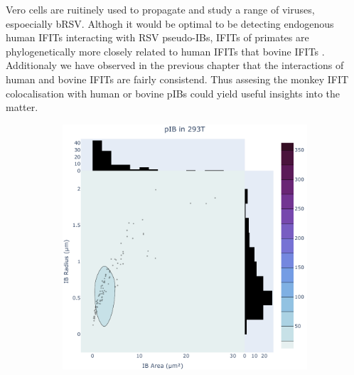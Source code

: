 Vero cells are ruitinely used to propagate and study a range of viruses, espoecially bRSV. Althogh it would be optimal to be detecting endogenous human IFITs interacting with RSV pseudo-IBs, IFITs of primates are phylogenetically more closely related to human IFITs that bovine IFITs \cite{Zhou2013InterferonDefense.}. Additionaly we have observed in the previous chapter that the interactions of human and bovine IFITs are fairly consistend. Thus assesing the monkey IFIT colocalisation with human or bovine pIBs could yield useful insights into the matter.

\begin{figure}
    \begin{subfigure}{0.495\textwidth}
        \caption{}
        \includegraphics[width=\textwidth]{09. Chapter 4/Figs/01. pIB/01. pIB characterisation/01. heatmap_pib-293t.pdf} 
    \end{subfigure}
    \hfill
    \begin{subfigure}{0.495\textwidth}
        \caption{}

\end{subfigure}
\end{figure}
